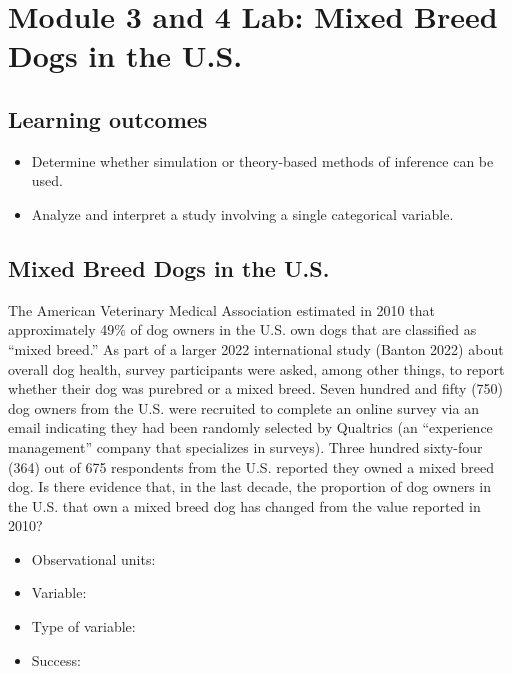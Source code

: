 \documentclass[
]{report}
\begin{document}
\section{Module 3 and 4 Lab: Mixed Breed Dogs in the U.S.}\label{module-3-and-4-lab-mixed-breed-dogs-in-the-u.s.}


\subsection{Learning outcomes}\label{learning-outcomes-8}

\begin{itemize}
\item
  Determine whether simulation or theory-based methods of inference can be used.
\item
  Analyze and interpret a study involving a single categorical variable.
\end{itemize}

\subsection{Mixed Breed Dogs in the U.S.}\label{mixed-breed-dogs-in-the-u.s.}

The American Veterinary Medical Association estimated in 2010 that approximately 49\% of dog owners in the U.S. own dogs that are classified as ``mixed breed.'' As part of a larger 2022 international study (Banton 2022) about overall dog health, survey participants were asked, among other things, to report whether their dog was purebred or a mixed breed. Seven hundred and fifty (750) dog owners from the U.S. were recruited to complete an online survey via an email indicating they had been randomly selected by Qualtrics (an ``experience management'' company that specializes in surveys). Three hundred sixty-four (364) out of 675 respondents from the U.S. reported they owned a mixed breed dog. Is there evidence that, in the last decade, the proportion of dog owners in the U.S. that own a mixed breed dog has changed from the value reported in 2010?

\begin{itemize}
\item
  Observational units:
\item
  Variable:
\item
  Type of variable:
\item
  Success:
\end{itemize}
\end{document}
